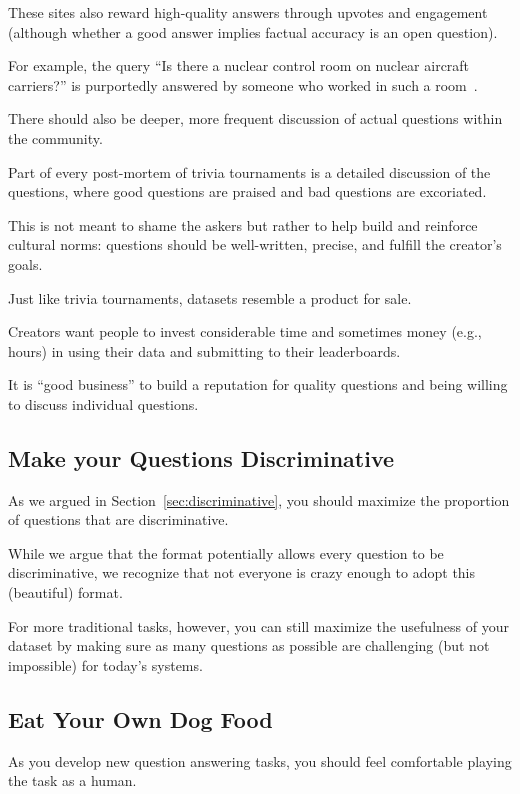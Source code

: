 These sites also reward high-quality answers through upvotes and engagement (although whether a good answer implies factual accuracy is an open question).

For example, the  query ``Is there a nuclear control room on nuclear aircraft carriers?'' is purportedly answered by someone who worked in such a room~\citep{humphries-17}.

There should also be deeper, more frequent discussion of actual questions within the  community.

Part of every post-mortem of trivia tournaments is a detailed discussion of the questions, where good questions are praised and bad questions are excoriated.

This is not meant to shame the askers but rather to help build and reinforce cultural norms: questions should be well-written, precise, and fulfill the creator's goals.

Just like trivia tournaments,  datasets resemble a product for sale.

Creators want people to invest considerable time and sometimes money (e.g.,  hours) in using their data and submitting to their leaderboards.

It is ``good business'' to build a reputation for quality questions and being willing to discuss individual questions.

\subsection{Make your Questions Discriminative}

As we argued in Section~\ref{sec:discriminative}, you should maximize the proportion of questions that are discriminative.

While we argue that the \qb{} format potentially allows every question to be discriminative, we recognize that not everyone is crazy enough to adopt this (beautiful) format.

For more traditional  tasks, however, you can still maximize the usefulness of your dataset by making sure as many questions as possible are challenging (but not impossible) for today's  systems.

\subsection{Eat Your Own Dog Food}

As you develop new question answering tasks, you should feel comfortable playing the task as a human.

